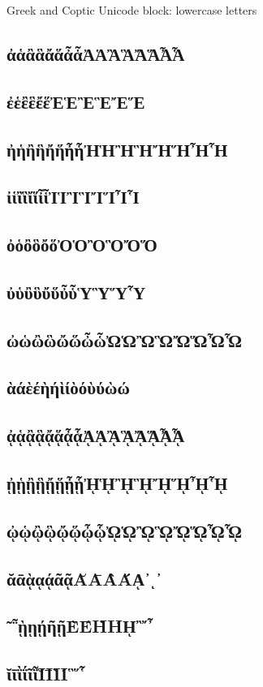 \documentclass{article}
\begin{document}
Greek and Coptic Unicode block: lowercase letters

\subsection{ἀἁἂἃἄἅἆἇἈἉἊἋἌἍἎἏ}
\subsection{ἐἑἒἓἔἕἘἙἚἛἜἝ}
\subsection{ἠἡἢἣἤἥἦἧἨἩἪἫἬἭἮἯ}
\subsection{ἰἱἲἳἴἵἶἷἸἹἺἻἼἽἾἿ}
\subsection{ὀὁὂὃὄὅὈὉὊὋὌὍ}
\subsection{ὐὑὒὓὔὕὖὗὙὛὝὟ}
\subsection{ὠὡὢὣὤὥὦὧὨὩὪὫὬὭὮὯ}
\subsection{ὰάὲέὴήὶίὸόὺύὼώ}
\subsection{ᾀᾁᾂᾃᾄᾅᾆᾇᾈᾉᾊᾋᾌᾍᾎᾏ}
\subsection{ᾐᾑᾒᾓᾔᾕᾖᾗᾘᾙᾚᾛᾜᾝᾞᾟ}
\subsection{ᾠᾡᾢᾣᾤᾥᾦᾧᾨᾩᾪᾫᾬᾭᾮᾯ}
\subsection{ᾰᾱᾲᾳᾴᾶᾷᾸᾹᾺΆᾼ᾽ι᾿}
\subsection{῀῁ῂῃῄῆῇῈΈῊΉῌ῍῎῏}
\subsection{ῐῑῒΐῖῗῘῙῚΊ῝῞῟}
\end{document}
